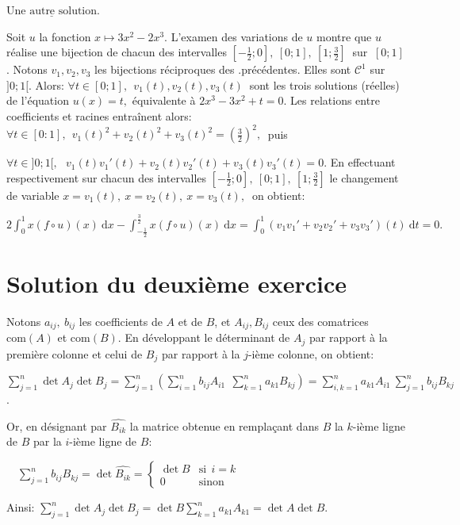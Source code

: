 $\underline { \text{Une autre solution}}$. %

Soit $u$ la fonction $x \longmapsto 3x^2 -2x^3.$ L'examen des variations de $u$ montre que $u$ réalise une bijection de chacun des intervalles
$[ -\frac {1}{2};0],\:[0;1],\:[1;\frac {3}{2}]\:$ sur $\: [0;1]$.
Notons $v_1,v_2,v_3$ les bijections réciproques des .précédentes. Elles sont  $\mathcal C ^1$ sur $]0;1[$.
Alors: $\forall t \in [0;1],\:\: v_1(t), v_2(t), v_3(t)\:$ sont les trois solutions (réelles) de l'équation $u(x) = t,$ équivalente à $2x^3 -3x^2 +t =0.$ 
Les relations entre coefficients et racines entraînent alors: $\forall t \in [0:1],\:\: v_1(t)^2 +v_2(t)^2 +v_3(t)^2 = \left(\frac 32\right) ^2,\:$ puis

$\forall t \in ]0;1[,\:\:\:  v_1(t)v_1'(t)+ v_2(t)v_2'(t) + v_3(t)v_3'(t) = 0.$ 
En effectuant respectivement sur chacun des intervalles $[-\frac12;0],\:[0;1],\: [1;\frac 32]$  le changement de variable $x=v_1(t),\:x=v_2(t),\:x=v_3(t),\:$  on obtient:

$\displaystyle  2\int_0 ^1 x(f\circ  u)(x)\: \mathrm d x - \int_{-\frac 12}^{\frac 32} x(f\circ u) (x) \:\mathrm d x = \int_0^1 \left(v_1v_1'
+ v_2v_2'+v_3v_3' \right) (t) \:\mathrm d t =0.$ 

\section{ Solution du deuxième exercice} %

Notons $a_{ij}, \:b_{ij}$ les coefficients de $A$ et de $B$, et ${A_{ij}}, {B_{ij}}$ ceux des comatrices $\text {com}(A)$ et $\text{com}(B).$
En développant le déterminant de $A_j$ par rapport à la première colonne et celui de $B_j$ par rapport à la $j$-ième colonne, on obtient:

     $\displaystyle \sum _{j=1}^n \det {A_j} \det {B_j} = \sum _{j=1}^n\left(\sum _{i=1}^n  b_{i j}{A_{i 1}}\:\:\sum _{k=1}^n  a_{k1} {B_{k j}}\right)= \sum _{i,k =1}^n a_{k1}{A_{i1}}\:\sum_{j=1}^n b_{ij }{B_{kj}}$. 
 
 Or, en désignant par $\widehat{B_{ik}}$ la matrice obtenue en remplaçant dans $B$ la $k$-ième ligne de $B$ par la $i$-ième ligne de $B$:
 
 $\quad \displaystyle \sum _{j=1}^n  b_{ij}{B_{kj}}= \det {\widehat{B_{ik}}}= \left\{\begin{array} {cl} \det B & \text{si}\:\: i=k\\ 0& \text{sinon} \end{array} \right.$
 
 Ainsi: $\displaystyle \sum _{j=1}^n \det {A_j} \det {B_j}= \det{B}\sum _{k=1}^n a_{k1} A_{k1} = \det {A}\det{B}.$
